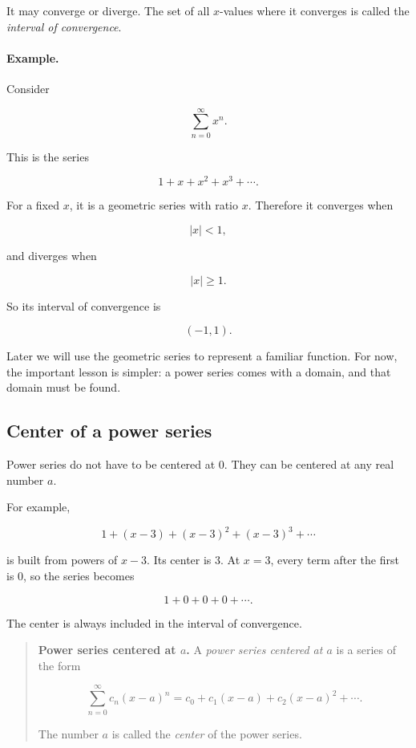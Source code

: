It may converge or diverge.  The set of all \(x\)-values where it converges is called
the \emph{interval of convergence}.

\paragraph{Example.}
Consider

\[
\sum_{n=0}^{\infty} x^n.
\]

This is the series

\[
1+x+x^2+x^3+\cdots.
\]

For a fixed \(x\), it is a geometric series with ratio \(x\).  Therefore it converges
when

\[
|x|<1,
\]

and diverges when

\[
|x|\ge 1.
\]

So its interval of convergence is

\[
\boxed{(-1,1).}
\]

Later we will use the geometric series to represent a familiar function.  For now, the
important lesson is simpler: a power series comes with a domain, and that domain
must be found.

\subsection{Center of a power series}
\label{subsec:center-of-power-series}

Power series do not have to be centered at \(0\).  They can be centered at any real
number \(a\).

For example,

\[
1+(x-3)+(x-3)^2+(x-3)^3+\cdots
\]

is built from powers of \(x-3\).  Its center is \(3\).  At \(x=3\), every term after the
first is \(0\), so the series becomes

\[
1+0+0+0+\cdots.
\]

The center is always included in the interval of convergence.

\begin{quote}
\textbf{Power series centered at \(a\).}
A \emph{power series centered at \(a\)} is a series of the form

\[
\boxed{
\sum_{n=0}^{\infty} c_n(x-a)^n
=
c_0+c_1(x-a)+c_2(x-a)^2+\cdots.
}
\]

The number \(a\) is called the \emph{center} of the power series.
\end{quote}

